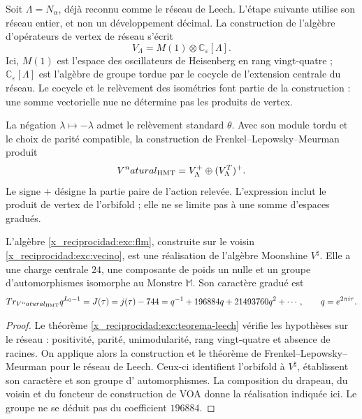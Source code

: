 Soit $\Lambda=N_\alpha$, déjà reconnu comme le réseau de Leech. L'étape suivante utilise son réseau entier, et non un développement décimal. La construction de l'algèbre d'opérateurs de vertex de réseau s'écrit
\[
 V_\Lambda=M(1)\otimes\mathbb C_\varepsilon[\Lambda].
\]
Ici, $M(1)$ est l'espace des oscillateurs de Heisenberg en rang vingt-quatre ; $\mathbb C_\varepsilon[\Lambda]$ est l'algèbre de groupe tordue par le cocycle de l'extension centrale du réseau. Le cocycle et le relèvement des isométries font partie de la construction : une somme vectorielle nue ne détermine pas les produits de vertex.

La négation $\lambda\mapsto-\lambda$ admet le relèvement standard
$\theta$. Avec son module tordu et le choix de parité compatible,
la construction de Frenkel--Lepowsky--Meurman produit
\begin{equation}
 V^\natural_{\rm HMT}
   =V_\Lambda^+\oplus(V_\Lambda^T)^+.
 \label{x_reciprocidad:exc:flm}
\end{equation}
Le signe $+$ désigne la partie paire de l'action relevée. L'expression
inclut le produit de vertex de l'orbifold ; elle ne se limite pas à une somme
d'espaces gradués.

\begin{theorem}
\label{x_reciprocidad:exc:moonshine}
L'algèbre \eqref{x_reciprocidad:exc:flm}, construite sur le voisin
\eqref{x_reciprocidad:exc:vecino}, est une réalisation de l'algèbre Moonshine
$V^\natural$. Elle a une charge centrale $24$, une composante de poids un nulle
et un groupe d'automorphismes isomorphe au Monstre $\mathbb M$. Son caractère
gradué est
\begin{equation}
 \operatorname{Tr}_{V^\natural_{\rm HMT}}q^{L_0-1}
   =J(\tau)=j(\tau)-744
   =q^{-1}+196884q+21493760q^2+\cdots,
 \qquad q=e^{2\pi i\tau}.
 \label{x_reciprocidad:exc:j}
\end{equation}
\end{theorem}

\begin{proof}
Le théorème \ref{x_reciprocidad:exc:teorema-leech} vérifie les hypothèses sur le réseau :
positivité, parité, unimodularité, rang vingt-quatre et absence de
racines. On applique alors la construction et le théorème de
Frenkel--Lepowsky--Meurman pour le réseau de Leech. Ceux-ci identifient
l'orbifold à $V^\natural$, établissent son caractère et son groupe d'
automorphismes. La composition du drapeau, du voisin et du foncteur
de construction de VOA donne la réalisation indiquée ici. Le groupe ne se déduit
pas du coefficient $196884$.
\end{proof}

